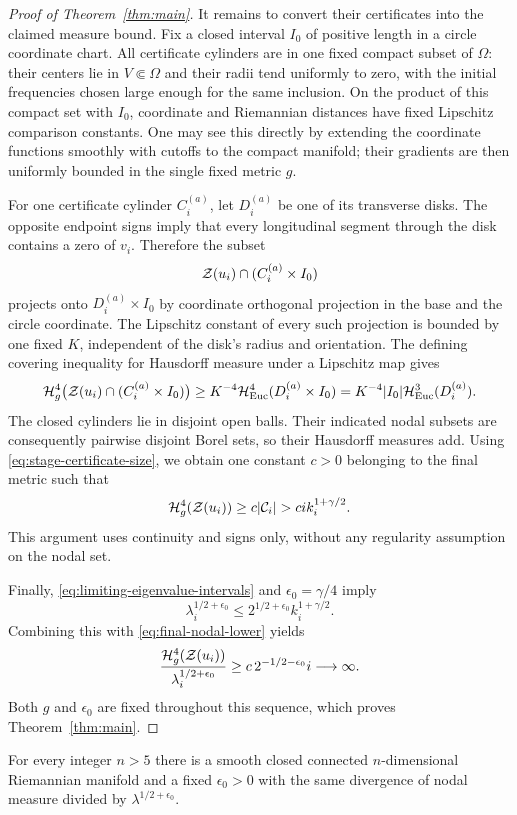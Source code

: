 \begin{proof}[Proof of Theorem~\ref{thm:main}]
It remains to convert their certificates into the claimed measure
bound. Fix a closed interval $I_0$ of positive length in a circle
coordinate chart. All certificate cylinders are in one fixed
compact subset of $\Omega$: their centers lie in $V\Subset\Omega$
and their radii tend uniformly to zero, with the initial
frequencies chosen large enough for the same inclusion. On the
product of this compact set with $I_0$, coordinate and Riemannian
distances have fixed Lipschitz comparison constants. One may see
this directly by extending the coordinate functions smoothly with
cutoffs to the compact manifold; their gradients are then
uniformly bounded in the single fixed metric $g$.

For one certificate cylinder $C_i^{(a)}$, let $D_i^{(a)}$ be one
of its transverse disks. The opposite endpoint signs imply that
every longitudinal segment through the disk contains a zero of
$v_i$. Therefore the subset
\[
 \mathcal Z(u_i)\cap(C_i^{(a)}\times I_0)
\]
projects onto $D_i^{(a)}\times I_0$ by coordinate orthogonal
projection in the base and the circle coordinate. The Lipschitz
constant of every such projection is bounded by one fixed $K$,
independent of the disk's radius and orientation. The defining
covering inequality for Hausdorff measure under a Lipschitz map
gives
\[
 \mathcal H_g^4\bigl(\mathcal Z(u_i)\cap(C_i^{(a)}\times I_0)\bigr)
 \ge K^{-4}\mathcal H_{\mathrm{Euc}}^4(D_i^{(a)}\times I_0)
 =K^{-4}|I_0|\mathcal H_{\mathrm{Euc}}^3(D_i^{(a)}).
\]
The closed cylinders lie in disjoint open balls. Their indicated
nodal subsets are consequently pairwise disjoint Borel sets, so
their Hausdorff measures add. Using
\eqref{eq:stage-certificate-size}, we obtain one constant $c>0$
belonging to the final metric such that
\begin{equation}\label{eq:final-nodal-lower}
 \mathcal H_g^4(\mathcal Z(u_i))\ge c|\mathcal C_i|
 > c i k_i^{1+\gamma/2}.
\end{equation}
This argument uses continuity and signs only, without any
regularity assumption on the nodal set.

Finally, \eqref{eq:limiting-eigenvalue-intervals} and
$\epsilon_0=\gamma/4$ imply
\[
 \lambda_i^{1/2+\epsilon_0}
 \le2^{1/2+\epsilon_0}k_i^{1+\gamma/2}.
\]
Combining this with \eqref{eq:final-nodal-lower} yields
\[
 \frac{\mathcal H_g^4(\mathcal Z(u_i))}{\lambda_i^{1/2+\epsilon_0}}
 \ge c\,2^{-1/2-\epsilon_0}i\longrightarrow\infty.
\]
Both $g$ and $\epsilon_0$ are fixed throughout this sequence,
which proves Theorem~\ref{thm:main}.
\end{proof}

\begin{corollary}
For every integer $n>5$ there is a smooth closed connected
$n$-dimensional Riemannian manifold and a fixed $\epsilon_0>0$
with the same divergence of nodal measure divided by
$\lambda^{1/2+\epsilon_0}$.
\end{corollary}

